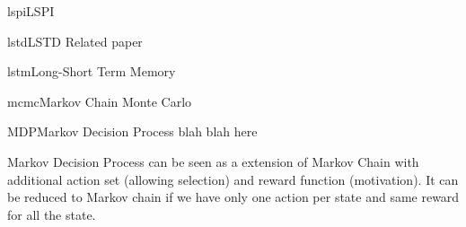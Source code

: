 \documentclass[9pt]{article}
\begin{document}
\begin{topic}{lspi}{LSPI}
\Working
\end{topic}

\begin{topic}{lstd}{LSTD}
\Working
Related paper
\end{topic}

\begin{topic}{lstm}{Long-Short Term Memory}
\Working
\end{topic}

\begin{topic}{mcmc}{Markov Chain Monte Carlo}
\Working
\end{topic}

\begin{topic}{MDP}{Markov Decision Process}
blah blah here

Markov Decision Process can be seen as a extension of Markov Chain with additional action set (allowing selection) and reward function (motivation). It can be reduced to Markov chain if we have only one action per state and same reward for all the state.
\end{topic}
\end{document}
